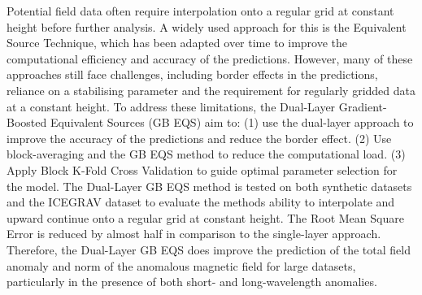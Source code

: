 Potential field data often require interpolation onto a regular grid at constant height before further analysis. A widely used approach for this is the Equivalent Source Technique, which has been adapted over time to improve the computational efficiency and accuracy of the predictions. However, many of these approaches still face challenges, including border effects in the predictions, reliance on a stabilising parameter and the requirement for regularly gridded data at a constant height. To address these limitations, the Dual-Layer Gradient-Boosted Equivalent Sources (GB EQS) aim to: (1) use the dual-layer approach to improve the accuracy of the predictions and reduce the border effect. (2) Use block-averaging and the GB EQS method to reduce the computational load. (3) Apply Block K-Fold Cross Validation to guide optimal parameter selection for the model. The Dual-Layer GB EQS method is tested on both synthetic datasets and the ICEGRAV dataset to evaluate the methods ability to interpolate and upward continue onto a regular grid at constant height. The Root Mean Square Error is reduced by almost half in comparison to the single-layer approach. Therefore, the Dual-Layer GB EQS does improve the prediction of the total field anomaly and norm of the anomalous magnetic field for large datasets, particularly in the presence of both short- and long-wavelength anomalies.
